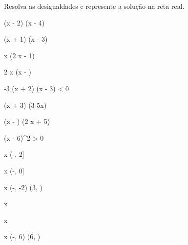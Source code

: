 \begin{exercicio}
    Resolva as desigualdades e represente a solução na reta real.
    \begin{mathlist}[2]
        \item \left(x - 2\right) \left(x - 4\right) 
        \item \left(x + 1\right) \left(x - 3\right) 
        \item x \left(2 x - 1\right) 
        \item 2 x \left(x - \right) 
        \item -3 \left(x + 2\right) \left(x - 3\right) < 0
        \item \left(x + 3\right) \left(3-5x\right) 
        \item \left(x - \right) \left(2 x + 5\right) 
        \item \left(x - 6\right)^{2} > 0
    \end{mathlist}
    \begin{answers}
        \begin{mathlist}[2]
            \item x \in \left(-\infty, 2\right] \cup \left[4, \infty\right)
            \item x \in \left[-1, 3\right]
            \item x \in \left(-\infty, 0\right] \cup \left[\sfrac{1}{2}, \infty\right)
            \item x \in \left[0, \sfrac{1}{4}\right]
            \item x \in \left(-\infty, -2\right) \cup \left(3, \infty\right)
            \item x \in {}
            \item x \in {}
            \item x \in \left(-\infty, 6\right) \cup \left(6, \infty\right)
        \end{mathlist}
    \end{answers}
\end{exercicio}

